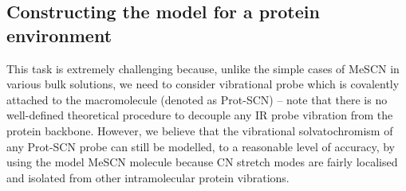 \documentclass[a4paper,titlepage,twoside,fleqn,12pt]{book}
\begin{document}
\begin{refsection}
\subsection{Constructing the model for a protein environment\label{s:scn-protein-interfac-model-environ}}

This task is
extremely challenging because, unlike the simple cases of
MeSCN in various bulk solutions, we need to consider
vibrational probe which is covalently attached to the
macromolecule (denoted as Prot-SCN) -- note that there is no
well\hyp{}defined theoretical procedure to decouple any IR probe
vibration from the protein backbone. However, we believe
that the vibrational solvatochromism of any Prot-SCN probe
can still be modelled, to a reasonable level of accuracy, by
using the model MeSCN molecule because CN stretch modes
are fairly localised and isolated from other intramolecular
protein vibrations.


\end{refsection}
\end{document}
